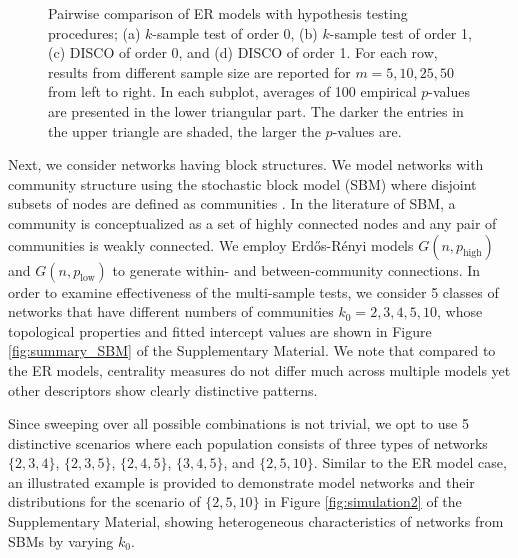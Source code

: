 \documentclass[12pt]{article}
\newcommand{\Erdos}{Erd\H{o}s}
\newcommand{\Renyi}{R\'{e}nyi }
\begin{document}
\begin{figure}[htbp]
\caption{Pairwise comparison of ER models with hypothesis testing procedures; (a) $k$-sample test of order 0, (b) $k$-sample test of order 1, (c) DISCO of order 0, and (d) DISCO of order 1. For each row, results from different sample size are reported for $m=5,10,25,50$ from left to right. In each subplot, averages of 100 empirical $p$-values are presented in the lower triangular part. The darker the entries in the upper triangle are shaded, the larger the $p$-values are. 
}
\label{fig:results_ER_hypothesis}
\end{figure}


Next, we consider networks having block structures. We model networks with community structure using the stochastic block model (SBM) where disjoint subsets of nodes are defined as communities \citep{holland_stochastic_1983-1}. In the literature of SBM, a community is conceptualized as a set of highly connected nodes and any pair of communities is weakly connected. We employ \Erdos-\Renyi models $G(n,p_{\textrm{high}})$ and $G(n,p_{\textrm{low}})$ to generate within- and between-community connections. In order to examine effectiveness of the multi-sample tests, we consider 5 classes of networks that have different numbers of communities $k_0=2,3,4,5,10$, whose topological properties and fitted intercept values are shown in Figure \ref{fig:summary_SBM} of the Supplementary Material. We note that compared to the ER models, centrality measures do not differ much across multiple models yet other descriptors show clearly distinctive patterns. 

Since sweeping over all possible combinations is not trivial, we opt to use 5 distinctive scenarios where each population consists of three types of networks $\lbrace 2,3,4\rbrace$, $\lbrace 2,3,5\rbrace$, $\lbrace 2,4,5\rbrace$, $\lbrace 3,4,5\rbrace$, and $\lbrace 2,5,10\rbrace $. Similar to the ER model case, an illustrated example is provided to demonstrate model networks and their distributions for the scenario of $\lbrace 2, 5, 10\rbrace$ in Figure \ref{fig:simulation2} of the Supplementary Material, showing heterogeneous characteristics of networks from SBMs by varying $k_0$.
\end{document}
